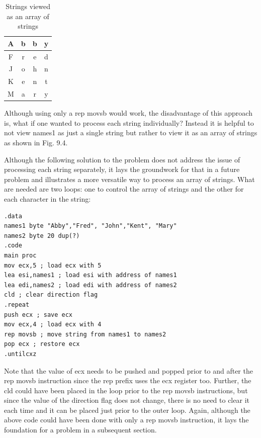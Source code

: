 \documentclass[10pt]{book}
\begin{document}
\begin{table}[h]
\centering
\begin{tabular}{|c|c|c|c|}
\hline
A & b & b & y \\
\hline
F & r & e & d \\
\hline
J & o & h & n \\
\hline
K & e & n & t \\
\hline
M & a & r & y \\
\hline
\end{tabular}
\caption{Strings viewed as an array of strings}
\end{table}

Although using only a rep movsb would work, the disadvantage of this approach is, what if one wanted to process each string individually? Instead it is helpful to not view names1 as just a single string but rather to view it as an array of strings as shown in Fig. 9.4.

Although the following solution to the problem does not address the issue of processing each string separately, it lays the groundwork for that in a future problem and illustrates a more versatile way to process an array of strings. What are needed are two loops: one to control the array of strings and the other for each character in the string:

\begin{verbatim}
.data
names1 byte "Abby","Fred", "John","Kent", "Mary"
names2 byte 20 dup(?)
.code
main proc
mov ecx,5 ; load ecx with 5
lea esi,names1 ; load esi with address of names1
lea edi,names2 ; load edi with address of names2
cld ; clear direction flag
.repeat
push ecx ; save ecx
mov ecx,4 ; load ecx with 4
rep movsb ; move string from names1 to names2
pop ecx ; restore ecx
.untilcxz
\end{verbatim}

Note that the value of ecx needs to be pushed and popped prior to and after the rep movsb instruction since the rep prefix uses the ecx register too. Further, the cld could have been placed in the loop prior to the rep movsb instructions, but since the value of the direction flag does not change, there is no need to clear it each time and it can be placed just prior to the outer loop. Again, although the above code could have been done with only a rep movsb instruction, it lays the foundation for a problem in a subsequent section.
\end{document}
